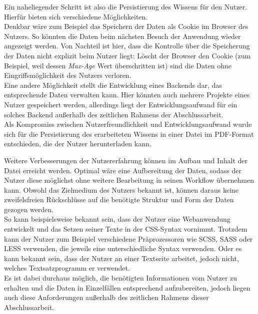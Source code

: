 Ein naheliegender Schritt ist also die Persistierung des Wissens für den Nutzer. Hierfür bieten sich verschiedene Möglichkeiten. \\
Denkbar wäre zum Beispiel das Speichern der Daten als Cookie\footnotemark{} im Browser des Nutzers. So könnten die Daten beim nächsten Besuch der Anwendung wieder angezeigt werden.
Von Nachteil ist hier, dass die Kontrolle über die Speicherung der Daten nicht explizit beim Nutzer liegt: Löscht der Browser den Cookie (zum Beispiel, weil dessen \textit{Max-Age}\footnotemark{} Wert überschritten ist) sind die Daten ohne Eingriffsmöglichkeit des Nutzers verloren.\\
Eine andere Möglichkeit stellt die Entwicklung eines Backends dar, das entsprechende Daten verwalten kann. Hier könnten auch mehrere Projekte eines Nutzer gespeichert werden, allerdings liegt der Entwicklungsaufwand für ein solches Backend außerhalb des zeitlichen Rahmens der Abschlussarbeit. \\
Als Kompromiss zwischen Nutzerfreundlichkeit und Entwicklungsaufwand wurde sich für die Persistierung des erarbeiteten Wissens in einer Datei im PDF-Format entschieden, die der Nutzer herunterladen kann.


Weitere Verbesserungen der Nutzererfahrung können im Aufbau und Inhalt der Datei erreicht werden. Optimal wäre eine Aufbereitung der Daten, sodass der Nutzer diese möglichst ohne weitere Bearbeitung in seinen Workflow übernehmen kann. Obwohl das Zielmedium des Nutzers bekannt ist, können daraus keine zweifelsfreien Rückschlüsse auf die benötigte Struktur und Form der Daten gezogen werden. \\
So kann beispielsweise bekannt sein, dass der Nutzer eine Webanwendung entwickelt und das Setzen seiner Texte in der CSS-Syntax vornimmt. Trotzdem kann der Nutzer zum Beispiel verschiedene Präprozessoren wie SCSS, SASS oder LESS verwenden, die jeweils eine unterschiedliche Syntax verwenden.
Oder es kann bekannt sein, dass der Nutzer an einer Textseite arbeitet, jedoch nicht, welches Textsatzprogramm er verwendet\footnotemark{}.\\
Es ist dabei durchaus möglich, die benötigten Informationen vom Nutzer zu erhalten und die Daten in Einzelfällen entsprechend aufzubereiten, jedoch liegen auch diese Anforderungen außerhalb des zeitlichen Rahmens dieser Abschlussarbeit.
